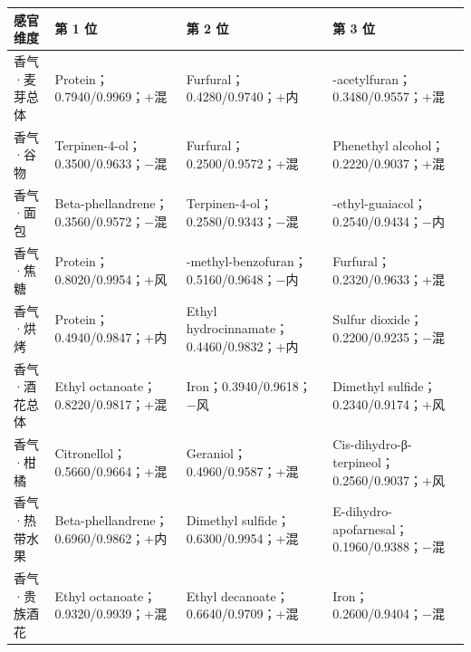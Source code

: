 \documentclass[
  chinese,
  11pt,
]{article}
\newcounter{none} %
\begin{document}
{\def\LTcaptype{none} %
\begin{longtable}[]{@{}
  >{\raggedright\arraybackslash}p{}
  >{\raggedright\arraybackslash}p{}
  >{\raggedright\arraybackslash}p{}
  >{\raggedright\arraybackslash}p{}@{}}
\toprule\noalign{}
\begin{minipage}[b]{\linewidth}\raggedright
感官维度
\end{minipage} & \begin{minipage}[b]{\linewidth}\raggedright
第 1 位
\end{minipage} & \begin{minipage}[b]{\linewidth}\raggedright
第 2 位
\end{minipage} & \begin{minipage}[b]{\linewidth}\raggedright
第 3 位
\end{minipage} \\
\midrule\noalign{}
\endhead
\bottomrule\noalign{}
\endlastfoot
香气·麦芽总体 & Protein；0.7940/0.9969；+混 &
Furfural；0.4280/0.9740；+内 & 2-acetylfuran；0.3480/0.9557；+混 \\
香气·谷物 & Terpinen-4-ol；0.3500/0.9633；−混 &
Furfural；0.2500/0.9572；+混 & Phenethyl alcohol；0.2220/0.9037；+混 \\
香气·面包 & Beta-phellandrene；0.3560/0.9572；−混 &
Terpinen-4-ol；0.2580/0.9343；−混 &
4-ethyl-guaiacol；0.2540/0.9434；−内 \\
香气·焦糖 & Protein；0.8020/0.9954；+风 &
2-methyl-benzofuran；0.5160/0.9648；−内 &
Furfural；0.2320/0.9633；+混 \\
香气·烘烤 & Protein；0.4940/0.9847；+内 & Ethyl
hydrocinnamate；0.4460/0.9832；+内 & Sulfur
dioxide；0.2200/0.9235；−混 \\
香气·酒花总体 & Ethyl octanoate；0.8220/0.9817；+混 &
Iron；0.3940/0.9618；−风 & Dimethyl sulfide；0.2340/0.9174；+风 \\
香气·柑橘 & Citronellol；0.5660/0.9664；+混 &
Geraniol；0.4960/0.9587；+混 &
Cis-dihydro-β-terpineol；0.2560/0.9037；+风 \\
香气·热带水果 & Beta-phellandrene；0.6960/0.9862；+内 & Dimethyl
sulfide；0.6300/0.9954；+混 &
E-dihydro-apofarnesal；0.1960/0.9388；−混 \\
香气·贵族酒花 & Ethyl octanoate；0.9320/0.9939；+混 & Ethyl
decanoate；0.6640/0.9709；+混 & Iron；0.2600/0.9404；−混 \\

\end{longtable}}
\end{document}
